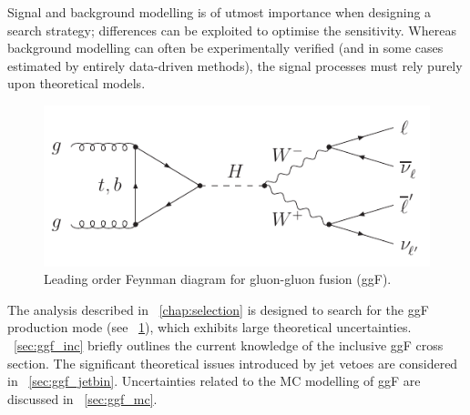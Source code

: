 
Signal and background modelling is of utmost importance when designing a search strategy; 
differences can be exploited to optimise the sensitivity. Whereas background modelling can 
often be experimentally verified (and in some cases estimated by entirely data-driven 
methods), the signal processes must rely purely upon theoretical models.

\begin{figure}[b]
	\includegraphics[width=\mediumfigwidth]{axodraw/ggf_WWlvlv.pdf}
	\caption{Leading order Feynman diagram for gluon-gluon fusion (ggF).}
	\label{fig:sig:ggF}
\end{figure}

The analysis described in \Chapter~\ref{chap:selection} is designed to search for the 
ggF production mode (see \Figure~\ref{fig:sig:ggF}), which exhibits large 
theoretical uncertainties. \Section~\ref{sec:ggf_inc} briefly outlines the current 
knowledge of the inclusive ggF cross section. The significant theoretical issues 
introduced by jet vetoes are considered in \Section~\ref{sec:ggf_jetbin}. Uncertainties 
related to the MC modelling of ggF are discussed in \Section~\ref{sec:ggf_mc}.
